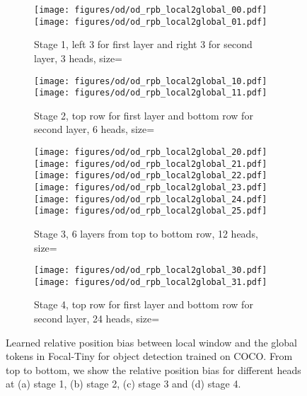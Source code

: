 \documentclass{article}
\begin{document}
\begin{figure}[t]
\begin{subfigure}{\textwidth}
  \texttt{[image: figures/od/od\_rpb\_local2global\_00.pdf]}
  \texttt{[image: figures/od/od\_rpb\_local2global\_01.pdf]}  
  \caption{Stage 1, left 3 for first layer and right 3 for second layer, 3 heads, size=}
\end{subfigure}
\begin{subfigure}{\textwidth}
  \texttt{[image: figures/od/od\_rpb\_local2global\_10.pdf]}
  \texttt{[image: figures/od/od\_rpb\_local2global\_11.pdf]}  
\caption{Stage 2, top row for first layer and bottom row for second layer, 6 heads, size=}
\end{subfigure}
\begin{subfigure}{\textwidth}
  \texttt{[image: figures/od/od\_rpb\_local2global\_20.pdf]}
  \texttt{[image: figures/od/od\_rpb\_local2global\_21.pdf]}    
  \texttt{[image: figures/od/od\_rpb\_local2global\_22.pdf]}    
  \texttt{[image: figures/od/od\_rpb\_local2global\_23.pdf]}    
  \texttt{[image: figures/od/od\_rpb\_local2global\_24.pdf]}    
  \texttt{[image: figures/od/od\_rpb\_local2global\_25.pdf]}      
\caption{Stage 3, 6 layers from top to bottom row, 12 heads, size=}
\end{subfigure}
\begin{subfigure}{\textwidth}
  \texttt{[image: figures/od/od\_rpb\_local2global\_30.pdf]}    
  \texttt{[image: figures/od/od\_rpb\_local2global\_31.pdf]}      
  \caption{Stage 4, top row for first layer and bottom row for second layer, 24 heads, size=}
\end{subfigure}
  \caption{Learned relative position bias between local window and the global tokens in Focal-Tiny for object detection trained on COCO. From top to bottom, we show the relative position bias for different heads at (a) stage 1, (b) stage 2, (c) stage 3 and (d) stage 4.}
  \label{fig:local2global_rpb_coco}
\end{figure}
\end{document}
